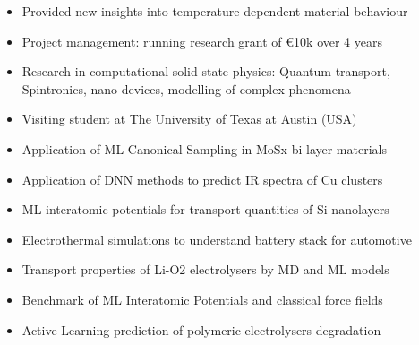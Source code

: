 \documentclass[10pt,a4paper,ragged2e,withhyper]{altacv}
\begin{document}
\begin{paracol}{2}
\begin{itemize}
\item Provided new insights into temperature-dependent material behaviour
\end{itemize}
\divider

\begin{itemize}
\item Project management: running research grant of \euro{10k} over 4 years
\item Research in computational solid state physics: Quantum transport, Spintronics, nano-devices, modelling of complex phenomena
\item Visiting student at The University of Texas at Austin (USA)
\end{itemize}

{}

\begin{itemize}
\item Application of ML Canonical Sampling in MoSx bi-layer materials 
\item Application of DNN methods to predict IR spectra of Cu clusters
\item ML interatomic potentials for transport quantities of Si nanolayers
\end{itemize}
\divider

\begin{itemize}
\item Electrothermal simulations to understand battery stack for automotive
\item Transport properties of Li-O2 electrolysers by MD and ML models
\item Benchmark of ML Interatomic Potentials and classical force fields %
\item Active Learning prediction of polymeric electrolysers degradation
\end{itemize}
\divider


\end{paracol}
\end{document}
